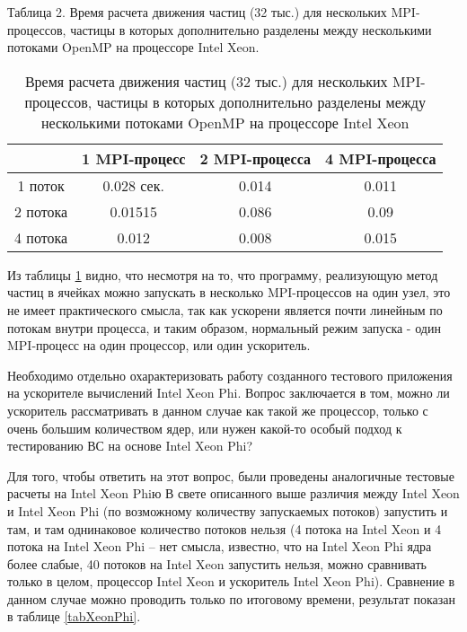 Таблица 2. Время расчета движения частиц (32 тыс.) для нескольких MPI-процессов, частицы в которых дополнительно разделены между несколькими потоками OpenMP на процессоре Intel Xeon.

\begin{table} [htbp]
	\centering
	\changecaptionwidth\captionwidth{15cm}
	\caption{Время расчета движения частиц (32 тыс.) для нескольких MPI-процессов, частицы в которых дополнительно разделены между несколькими потоками OpenMP на процессоре Intel Xeon}
	\label{tabXeon}%
	\begin{tabular}{| c | c | c| c|}
		\hline
          &  1 MPI-процесс & 2 MPI-процесса & 4 MPI-процесса \\ \hline
1 поток   & 0.028 сек.     & 0.014          & 0.011          \\ \hline
2 потока  & 0.01515        & 0.086          & 0.09           \\ \hline
4 потока  & 0.012          & 0.008          & 0.015          \\ \hline
	\end{tabular}
\end{table}

Из таблицы \ref{tabXeon} видно, что несмотря на то, что программу, реализующую метод частиц в ячейках можно запускать в несколько MPI-процессов на один узел, это не имеет практического смысла, так как ускорени является почти линейным по потокам внутри процесса, и таким образом, нормальный режим запуска - один MPI-процесс на один процессор, или один ускоритель.


Необходимо отдельно охарактеризовать работу созданного тестового приложения на ускорителе вычислений Intel Xeon Phi. Вопрос заключается в том, можно ли ускоритель рассматривать в данном случае как такой же процессор, только с очень большим количеством ядер, или нужен какой-то особый подход к тестированию ВС на основе Intel Xeon Phi?

Для того, чтобы ответить на этот вопрос, были проведены аналогичные тестовые расчеты на Intel Xeon Phiю 
В свете описанного выше различия между Intel Xeon и Intel Xeon Phi (по возможному количеству запускаемых потоков) запустить и там, и там однинаковое количество потоков нельзя (4 потока на Intel Xeon и 4 потока на Intel Xeon Phi – нет смысла, известно, что на Intel Xeon Phi ядра более слабые, 40 потоков на Intel Xeon запустить нельзя, можно сравнивать только в целом, процессор Intel Xeon и ускоритель Intel Xeon Phi). Сравнение в данном случае можно проводить только по итоговому времени, результат показан в таблице \ref{tabXeonPhi}. 

